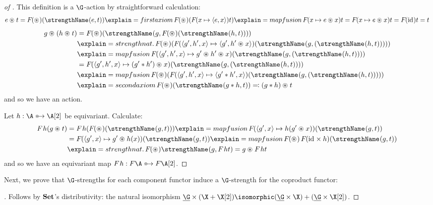 \begin{proof}[of ]%
  This definition is a $\G$-action by straightforward calculation:
  \[
    e \act t =
    \fmap (\act) (\strength(\unit, t))
    \explain={first axiom}
    \fmap (\act) (\fmap(\fun x \pair \unit x)t)
    \explain={map fusion}
    \fmap(\fun x \unit \act x)t
    =
    \fmap(\fun x \unit\act x)t
    =
    \fmap(\id)t
    =
    t
  \]
  \begin{align*}
    g \act (h \act t) &=
    \fmap (\act) (\strength(g, \fmap (\act) (\strength(h, t))))
    \\&\explain={strength nat.}
    \fmap (\act) (\fmap (\fun{\triple{g'}{h'}{x}}\pair{g'}{h'\act x})
      (\strength(g,
    (\strength(h, t)))))
    \\&\explain={map fusion}
    \fmap (\fun{\triple{g'}{h'}x}g'\act h'\act x)
    (\strength(g,
    (\strength(h, t))))
    \\&=
    \fmap (\fun{\triple{g'}{h'}x}(g'\mul h')\act x)
    (\strength(g,
    (\strength(h, t))))
    \\&\explain={map fusion}
    \fmap (\act) (\fmap (\fun{\triple{g'}{h'}x}\pair{g'\mul h'}x)
      (\strength(g,
    (\strength(h, t)))))
    \\&\explain={second axiom}
    \fmap (\act) (\strength(g \mul h, t))
    \defines
    (g\mul h) \act t
  \end{align*}
  and so we have an action.

  Let $h : \A \equito \B$ be equivariant. Calculate:
  \begin{align*}
    \fmap h (g \act t)
    &=
    \fmap h (\fmap (\act) (\gstrength (g, t)))
    \explain={map fusion}
    \fmap(\fun{\pair{g'}x}h(g' \act x))(\gstrength (g, t))
    \\&=
    \fmap(\fun{\pair{g'}x}g' \act h(x))(\gstrength (g, t))
    \explain={map fusion}
    \fmap(\act) \fmap(\id \times h)(\gstrength (g, t))
    \\&\explain={strength nat.}
    \fmap(\act) \gstrength(g, \fmap ht)
    =
    g \act \fmap h t
  \end{align*}
  and so we have an equivariant map $\fmap h : F\A \equito F\B$.
\end{proof}

Next, we prove that $\G$-strengths for each component functor induce a
$\G$-strength for the coproduct functor:

\begin{proof}[]%
  Follows by ${\mathbf{ Set}}$'s distributivity: the natural
  isomorphism $\carrier\G \times (\X \amalg \Y) \isomorphic
  (\carrier\G \times \X) \amalg (\carrier\G \times \Y)$.
\end{proof}

